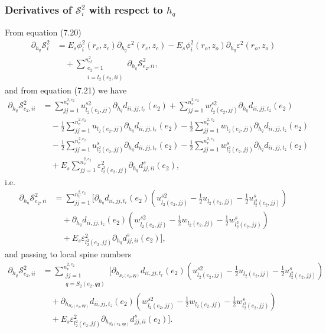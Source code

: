 \documentclass{article}
\begin{document}
\subsubsection{Derivatives of $\mathcal{S}_i^2$ with respect to $h_q$} %
From equation (7.20)
\begin{align}
\partial_{h_q} \mathcal{S}_i^2 &= E_s \phi_i^2(r_c,z_c) \partial_{h_q} \varepsilon^2(r_c,z_c) - E_s \phi_i^2(r_o,z_o) \partial_{h_q} \varepsilon^2(r_o,z_o) \nonumber\\
&\quad + \sum_{\substack{e_2=1\\ i=l_2(e_2,ii)}}^{n_{el}^2} \partial_{h_q} \mathcal{S}_{e_2,ii}^2, \tag{7.39}
\end{align}
and from equation (7.21) we have
\begin{align}
\partial_{h_q} \mathcal{S}_{e_2,ii}^2 &= \sum_{jj=1}^{n_v^{2,e_2}} u_{l_2(e_2,jj)}^{s2} \partial_{h_q} d_{ii,jj,t_r}(e_2) + \sum_{jj=1}^{n_v^{2,e_2}} w_{l_2(e_2,jj)}^{s2} \partial_{h_q} d_{ii,jj,t_z}(e_2) \nonumber\\
&\quad - \frac{1}{2} \sum_{jj=1}^{n_v^{2,e_2}} u_{l_2(e_2,jj)} \partial_{h_q} d_{ii,jj,t_r}(e_2) - \frac{1}{2} \sum_{jj=1}^{n_v^{2,e_2}} w_{l_2(e_2,jj)} \partial_{h_q} d_{ii,jj,t_z}(e_2) \nonumber\\
&\quad - \frac{1}{2} \sum_{jj=1}^{n_v^{2,e_2}} u_{l_2^2(e_2,jj)}^s \partial_{h_q} d_{ii,jj,t_r}(e_2) - \frac{1}{2} \sum_{jj=1}^{n_v^{2,e_2}} w_{l_2^2(e_2,jj)}^s \partial_{h_q} d_{ii,jj,t_z}(e_2) \nonumber\\
&\quad + E_s \sum_{jj=1}^{n_v^{2,e_2}} \varepsilon_{l_2^2(e_2,jj)}^2 \partial_{h_q} d_{jj,ii}^s(e_2), \tag{7.40}
\end{align}
i.e.
\begin{align}
\partial_{h_q} \mathcal{S}_{e_2,ii}^2 &= \sum_{jj=1}^{n_v^{2,e_2}} \Bigg[ \partial_{h_q} d_{ii,jj,t_r}(e_2) \left( u_{l_2(e_2,jj)}^{s2} - \frac{1}{2} u_{l_2(e_2,jj)} - \frac{1}{2} u_{l_2^2(e_2,jj)}^s \right) \nonumber\\
&\quad + \partial_{h_q} d_{ii,jj,t_z}(e_2) \left( w_{l_2(e_2,jj)}^{s2} - \frac{1}{2} w_{l_2(e_2,jj)} - \frac{1}{2} w_{l_2^2(e_2,jj)}^s \right) \nonumber\\
&\quad + E_s \varepsilon_{l_2^2(e_2,jj)}^2 \partial_{h_q} d_{jj,ii}^s(e_2) \Bigg], \tag{7.41}
\end{align}
and passing to local spine numbers
\begin{align}
\partial_{h_q} \mathcal{S}_{e_2,ii}^2 &= \sum_{\substack{jj=1\\ q=S_2(e_2,qq)}}^{n_v^{2,e_2}} \Bigg[ \partial_{h_{S_2(e_2,qq)}} d_{ii,jj,t_r}(e_2) \left( u_{l_2(e_2,jj)}^{s2} - \frac{1}{2} u_{l_2(e_2,jj)} - \frac{1}{2} u_{l_2^2(e_2,jj)}^s \right) \nonumber\\
&\quad + \partial_{h_{S_2(e_2,qq)}} d_{ii,jj,t_z}(e_2) \left( w_{l_2(e_2,jj)}^{s2} - \frac{1}{2} w_{l_2(e_2,jj)} - \frac{1}{2} w_{l_2^2(e_2,jj)}^s \right) \nonumber\\
&\quad + E_s \varepsilon_{l_2^2(e_2,jj)}^2 \partial_{h_{S_2(e_2,qq)}} d_{jj,ii}^s(e_2) \Bigg]. \tag{7.41}
\end{align}
\end{document}
